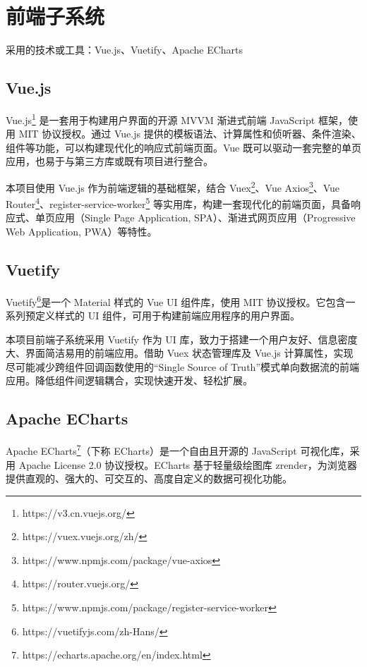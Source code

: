 \documentclass[a4paper,AutoFakeBold,oneside,12pt]{book}
\begin{document}
\section{前端子系统}

采用的技术或工具：Vue.js、Vuetify、Apache ECharts

\subsection{Vue.js}

Vue.js\footnote{https://v3.cn.vuejs.org/} 是一套用于构建用户界面的开源 MVVM 渐进式前端 JavaScript 框架，使用 MIT 协议授权。通过 Vue.js 提供的模板语法、计算属性和侦听器、条件渲染、组件等功能，可以构建现代化的响应式前端页面。Vue 既可以驱动一套完整的单页应用，也易于与第三方库或既有项目进行整合。

本项目使用 Vue.js 作为前端逻辑的基础框架，结合 Vuex\footnote{https://vuex.vuejs.org/zh/}、Vue Axios\footnote{https://www.npmjs.com/package/vue-axios}、Vue Router\footnote{https://router.vuejs.org/}、register-service-worker\footnote{https://www.npmjs.com/package/register-service-worker} 等实用库，构建一套现代化的前端页面，具备响应式、单页应用（Single Page Application, SPA）、渐进式网页应用（Progressive Web Application, PWA）等特性。

\subsection{Vuetify}

Vuetify\footnote{https://vuetifyjs.com/zh-Hans/}是一个 Material 样式的 Vue UI 组件库，使用 MIT 协议授权。它包含一系列预定义样式的 UI 组件，可用于构建前端应用程序的用户界面。

本项目前端子系统采用 Vuetify 作为 UI 库，致力于搭建一个用户友好、信息密度大、界面简洁易用的前端应用。借助 Vuex 状态管理库及 Vue.js 计算属性，实现尽可能减少跨组件回调函数使用的“Single Source of Truth”模式单向数据流的前端应用。降低组件间逻辑耦合，实现快速开发、轻松扩展。

\subsection{Apache ECharts}

Apache ECharts\footnote{https://echarts.apache.org/en/index.html}（下称 ECharts）是一个自由且开源的 JavaScript 可视化库，采用 Apache License 2.0 协议授权。ECharts 基于轻量级绘图库 zrender，为浏览器提供直观的、强大的、可交互的、高度自定义的数据可视化功能。
\end{document}
